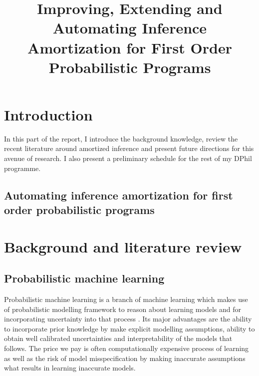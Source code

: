 \documentclass[12pt]{article}
\begin{document}




\title{Improving, Extending and Automating Inference Amortization for First Order Probabilistic Programs}
\date{}
\maketitle

\vspace{-90pt}

\section{Introduction}

In this part of the report, I introduce the background knowledge, review the recent literature around amortized inference and present future directions for this avenue of research. 
I also present a preliminary schedule for the rest of my DPhil programme.

\subsection{Automating inference amortization for first order probabilistic programs}



\section{Background and literature review}

\subsection{Probabilistic machine learning}
Probabilistic machine learning is a branch of machine learning which makes use of probabilistic modelling framework to reason about learning models and for incorporating uncertainty into that process \citep{Ghahramani2015}.
Its major advantages are the ability to incorporate prior knowledge by make explicit modelling assumptions, ability to obtain well calibrated uncertainties and interpretability of the models that follows.
The price we pay is often computationally expensive process of learning as well as the risk of model misspecification by making inaccurate assumptions what results in learning inaccurate models.
\end{document}

